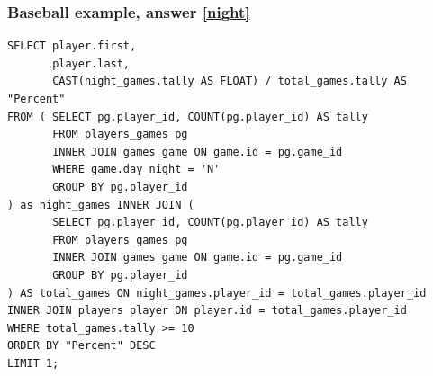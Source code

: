 \documentclass[aspectratio=169]{beamer}
\begin{document}
\begin{frame}[fragile]
  \frametitle{Baseball example, answer \ref{night}}
  \begin{lstlisting}
SELECT player.first,
       player.last,
       CAST(night_games.tally AS FLOAT) / total_games.tally AS "Percent"
FROM ( SELECT pg.player_id, COUNT(pg.player_id) AS tally
       FROM players_games pg
       INNER JOIN games game ON game.id = pg.game_id
       WHERE game.day_night = 'N'
       GROUP BY pg.player_id
) as night_games INNER JOIN (
       SELECT pg.player_id, COUNT(pg.player_id) AS tally
       FROM players_games pg
       INNER JOIN games game ON game.id = pg.game_id
       GROUP BY pg.player_id
) AS total_games ON night_games.player_id = total_games.player_id
INNER JOIN players player ON player.id = total_games.player_id
WHERE total_games.tally >= 10
ORDER BY "Percent" DESC
LIMIT 1;
  \end{lstlisting}
\end{frame}
\end{document}

